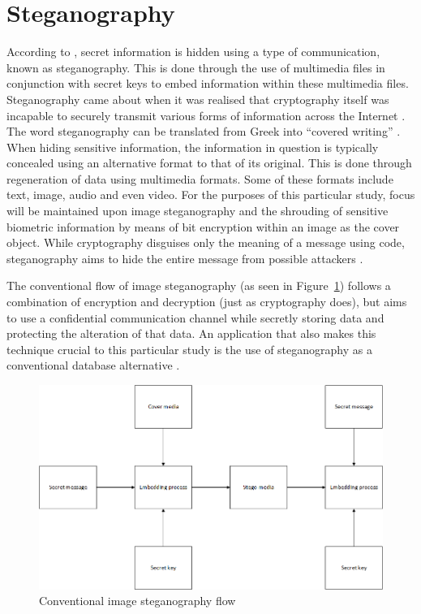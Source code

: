 \section[Steganography]{Steganography}
According to \cite{Kishor2016}, secret information is hidden using a type of communication, known as steganography. This is done through the use of multimedia files in conjunction with secret keys to embed information within these multimedia files. Steganography came about when it was realised that cryptography itself was incapable to securely transmit various forms of information across the Internet \citep{Jain2016}. The word steganography can be translated from Greek into “covered writing” \citep{Pandit2016}. When hiding sensitive information, the information in question is typically concealed using an alternative format to that of its original. This is done through regeneration of data using multimedia formats. Some of these formats include text, image, audio and even video. For the purposes of this particular study, focus will be maintained upon image steganography and the shrouding of sensitive biometric information by means of bit encryption within an image as the cover object. While cryptography disguises only the meaning of a message using code, steganography aims to hide the entire message from possible attackers \citep{Kishor2016, Pradhan2016}.

The conventional flow of image steganography (as seen in Figure~\ref{fig:Conventional image steganography flow}) follows a combination of encryption and decryption (just as cryptography does), but aims to use a confidential communication channel while secretly storing data and protecting the alteration of that data. An application that also makes this technique crucial to this particular study is the use of steganography as a conventional database alternative \citep{Pandit2016}.


  
\begin{figure}[htbp!] 
\centering    
\includegraphics[width=1.0\textwidth]{Chapter2/Figs/Figure2-4.png}
\caption[Conventional image steganography flow]{Conventional image steganography flow}
\label{fig:Conventional image steganography flow}
\end{figure}

